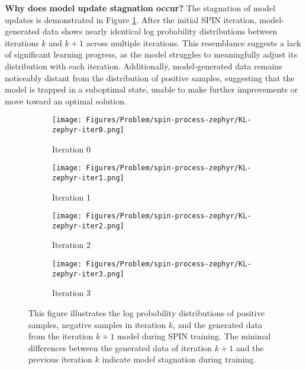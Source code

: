 \textbf{Why does model update stagnation occur?} The stagnation of model updates is demonstrated in Figure \ref{fig2}. After the initial SPIN iteration, model-generated data shows nearly identical log probability distributions between iterations $k$ and $k+1$ across multiple iterations. This resemblance suggests a lack of significant learning progress, as the model struggles to meaningfully adjust its distribution with each iteration. Additionally, model-generated data remains noticeably distant from the distribution of positive samples, suggesting that the model is trapped in a suboptimal state, unable to make further improvements or move toward an optimal solution.

\begin{figure}[h]
    \centering
    \begin{subfigure}{0.24\textwidth}
        \centering
        \texttt{[image: Figures/Problem/spin-process-zephyr/KL-zephyr-iter0.png]}
        \caption{Iteration 0}
    \end{subfigure}
    \begin{subfigure}{0.24\textwidth}
        \centering
        \texttt{[image: Figures/Problem/spin-process-zephyr/KL-zephyr-iter1.png]}
        \caption{Iteration 1}
    \end{subfigure}
    \begin{subfigure}{0.24\textwidth}
        \centering
        \texttt{[image: Figures/Problem/spin-process-zephyr/KL-zephyr-iter2.png]}
        \caption{Iteration 2}
    \end{subfigure}
    \begin{subfigure}{0.24\textwidth}
        \centering
        \texttt{[image: Figures/Problem/spin-process-zephyr/KL-zephyr-iter3.png]}
        \caption{Iteration 3}
    \end{subfigure}
    \caption{This figure illustrates the log probability distributions of positive samples, negative samples in iteration $k$, and the generated data from the iteration $k+1$ model during SPIN training. The minimal differences between the generated data of iteration $k+1$ and the previous iteration $k$ indicate model stagnation during training.}
    \label{fig2}
\end{figure}